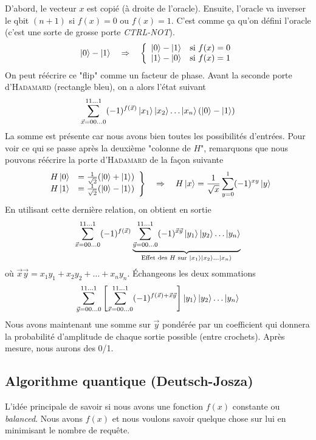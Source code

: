 D'abord, le vecteur $x$ est copié (à droite de l'oracle). Ensuite, l'oracle va inverser le 
qbit $(n+1)$ si $f(x)=0$ ou $f(x)=1$. C'est comme ça qu'on défini l'oracle (c'est une sorte
de grosse porte \textit{CTRL-NOT}). 
\begin{equation}
\ket0-\ket1 \quad\Rightarrow\quad \left\{\begin{array}{ll}
\ket0-\ket1&\text{si }f(x)=0\\
\ket1-\ket0&\text{si }f(x)=1
\end{array}\right.
\end{equation}
On peut réécrire ce "flip" comme un facteur de phase. Avant la seconde porte 
d'\textsc{Hadamard} (rectangle bleu), on a alors l'état suivant
\begin{equation}
\sum_{\vec{x}=00\dots0}^{11\dots1} (-1)^{f(\vec x)}\ket{x_1}\ket{x_2}\dots\ket{x_n}\left(
\ket0-\ket1\right)
\end{equation}
La somme est présente car nous avons bien toutes les possibilités d'entrées. Pour voir
ce qui se passe après la deuxième "colonne de $H$", remarquons que nous pouvons réécrire
la porte d'\textsc{Hadamard} de la façon suivante
\begin{equation}
\left.\begin{array}{ll}
H\ket0 &=\frac{1}{\sqrt{2}}(\ket0+\ket1)\\
H\ket1 &=\frac{1}{\sqrt{2}}(\ket0-\ket1)
\end{array}\right\}\quad\Rightarrow\quad H\ket x=\frac{1}{\sqrt{x}}\sum_{y=0}^1(-1)^{xy}\ket y
\end{equation}
En utilisant cette dernière relation, on obtient en sortie
\begin{equation}
\sum_{\vec{x}=00\dots0}^{11\dots1} (-1)^{f(\vec x)}\underbrace{\sum_{\vec{y}=00\dots0}^{11\dots1} (-1)^{
\vec{x}\vec{y}}\ket{y_1}\ket{y_2}\dots\ket{y_n}}_{\text{Effet des $H$ sur } \ket{x_1}
\ket{x_2}\dots\ket{x_n}}
\end{equation}
où $\vec{x}\vec{y} = x_1y_1+x_2y_2+\dots +x_ny_n$. Échangeons les deux sommations
\begin{equation}
\sum_{\vec{y}=00\dots0}^{11\dots1} \left[\sum_{\vec{x}=00\dots0}^{11\dots1} (-1)^{f(\vec{x})+
\vec{x}\vec{y}}\right]\ket{y_1}\ket{y_2}\dots\ket{y_n}
\end{equation}
Nous avons maintenant une somme sur $\vec{y}$ pondérée par un coefficient qui donnera la 
probabilité d'amplitude de chaque sortie possible (entre crochets). Après mesure, nous
aurons des 0/1.

\subsection{Algorithme quantique (Deutsch-Josza)}
L'idée principale de savoir si nous avons une fonction $f(x)$ constante ou \textit{balanced}. 
Nous avons $f(x)$ et nous voulons savoir quelque chose sur lui en minimisant le nombre de
requête.

